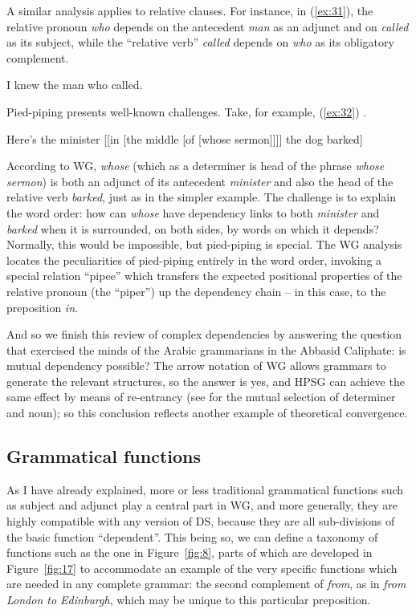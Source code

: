 \documentclass[output=paper,biblatex,babelshorthands,newtxmath,draftmode,colorlinks,citecolor=brown]{langscibook}
\begin{document}
A similar analysis applies to relative clauses. For instance, in (\ref{ex:31}), the relative pronoun \emph{who} depends on the antecedent \emph{man} as an adjunct and on \emph{called} as its subject, while the ``relative verb'' \emph{called} depends on \emph{who} as its obligatory complement.

\begin{exe}
	\ex \label{ex:31} I knew the man who called.
\end{exe}

Pied-piping presents well-known challenges. Take, for example, (\ref{ex:32}) \citep[212]{ps2}.

\begin{exe}
	\ex \label{ex:32} Here's the minister [[in [the middle [of [whose sermon]]]] the dog barked]
\end{exe}

\noindent
According to WG, \emph{whose} (which as a determiner is head of the phrase \emph{whose sermon}) is both an adjunct of its antecedent \emph{minister} and also the head of the relative verb \emph{barked}, just as in the simpler example. The challenge is to explain the word order: how can \emph{whose} have dependency links to both \emph{minister} and \emph{barked} when it is surrounded, on both sides, by words on which it depends? Normally, this would be impossible, but pied-piping is special. The WG analysis \citep{Hudson2018a} locates the peculiarities of pied-piping entirely in the word order, invoking a special relation ``pipee'' which transfers the expected positional properties of the relative pronoun (the ``piper'') up the dependency chain – in this case, to the preposition \emph{in}.

And so we finish this review of complex dependencies by answering the question that exercised the
minds of the Arabic grammarians in the Abbasid Ca\-liph\-ate: is mutual dependency possible?
The arrow notation of WG allows grammars to generate the relevant structures, so the answer is yes,
and HPSG can achieve the same effect by means of re-entrancy (see
   for the mutual selection of determiner and noun); so this conclusion reflects
another example of theoretical convergence.


\subsection{Grammatical functions}
\label{sec:5.3}

As I have already explained, more or less traditional grammatical functions such as subject and
adjunct play a central part in WG, and more generally, they are highly compatible with any version
of DS, because they are all sub-divisions of the basic function ``dependent''. This being so, we can
define a taxonomy of functions such as the one in Figure~\ref{fig:8}, parts of which are developed in Figure~\ref{fig:17} to accommodate an example of the very specific functions which are needed in any complete grammar: the second complement of \emph{from}, as in \emph{from London to Edinburgh}, which may be unique to this particular preposition.
\end{document}
